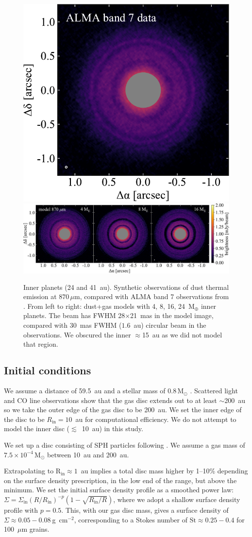 \documentclass[usenatbib,a4paper,times]{mnras}
\newcommand{\st}{\mathrm{St}}
\renewcommand{\sun}{\mathrm{M}_{\odot}}
\renewcommand{\earth}{\mathrm{M}_{\oplus}}
\begin{document}
\begin{figure}
   \begin{center}
      \includegraphics[height=0.200\textwidth]{figs/andrews-2016.pdf} \quad
      \includegraphics[height=0.200\textwidth]{figs/alma-image.pdf}
      \caption{Inner planets (24 and 41~au). Synthetic observations of dust
         thermal emission at $870\,\mu$m, compared with ALMA band 7 observations
         from \citet{andrews:2016}. From left to right: dust+gas models with 4,
         8, 16, 24~$\earth$ inner planets. The beam has FWHM 28$\times$21~mas in
         the model image, compared with 30~mas FWHM ($1.6$~au) circular beam in
         the observations. We obscured the inner $\approx$15~au as we did not
         model that region.\label{fig:alma}}
   \end{center}
\end{figure}





\subsection{Initial conditions}

We assume a distance of 59.5~au \citep{gaia-collaboration:2016} and a stellar
mass of $0.8\,\sun{}$ \citep{andrews:2012}. Scattered light and CO line
observations show that the gas disc extends out to at least $\sim$200~au
\citep{thi:2010} so we take the outer edge of the gas disc to be 200~au. We set
the inner edge of the disc to be $R_{\mathrm{in}}=10$~au for computational
efficiency. We do not attempt to model the inner disc ($\lesssim$~10~au) in this
study.

We set up a disc consisting of SPH particles following \citet{lodato:2010}. We
assume a gas mass of $7.5\times 10^{-4}\,\sun{}$ between 10~au and 200~au.

Extrapolating to $\mathrm{R_{in}}\approx 1$~au implies a total disc mass higher
by 1--10\% depending on the surface density prescription, in the low end of the
\citet{thi:2010} range, but above the \citet{teague:2018a} minimum.  We set the
initial surface density profile as a smoothed power law: $\Sigma =
\Sigma_{\mathrm{in}} {(R/R_{\mathrm{in}})}^{-p} (1-\sqrt{R_{\mathrm{in}}/R})$,
where we adopt a shallow surface density profile with $p=0.5$. This, with our
gas disc mass, gives a surface density of $\Sigma \approx 0.05-0.08\
$g~cm${}^{-2}$, corresponding to a Stokes number of $\st{}\approx 0.25-0.4$ for
100~$\mu$m grains.
\end{document}
